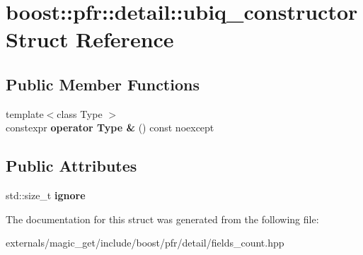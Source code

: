 \hypertarget{structboost_1_1pfr_1_1detail_1_1ubiq__constructor}{}\section{boost\+:\+:pfr\+:\+:detail\+:\+:ubiq\+\_\+constructor Struct Reference}
\label{structboost_1_1pfr_1_1detail_1_1ubiq__constructor}
\subsection*{Public Member Functions}
\begin{DoxyCompactItemize}
\item 
\mbox{\label{structboost_1_1pfr_1_1detail_1_1ubiq__constructor_aa3b478228a2aae32ef32e2a008fe1a7f}} 
{\footnotesize template$<$class Type $>$ }\\constexpr {\bfseries operator Type \&} () const noexcept
\end{DoxyCompactItemize}
\subsection*{Public Attributes}
\begin{DoxyCompactItemize}
\item 
\mbox{\label{structboost_1_1pfr_1_1detail_1_1ubiq__constructor_a13014e36d9e4a4c1dbad542530d6f387}} 
std\+::size\+\_\+t {\bfseries ignore}
\end{DoxyCompactItemize}


The documentation for this struct was generated from the following file\+:\begin{DoxyCompactItemize}
\item 
externals/magic\+\_\+get/include/boost/pfr/detail/fields\+\_\+count.\+hpp\end{DoxyCompactItemize}

